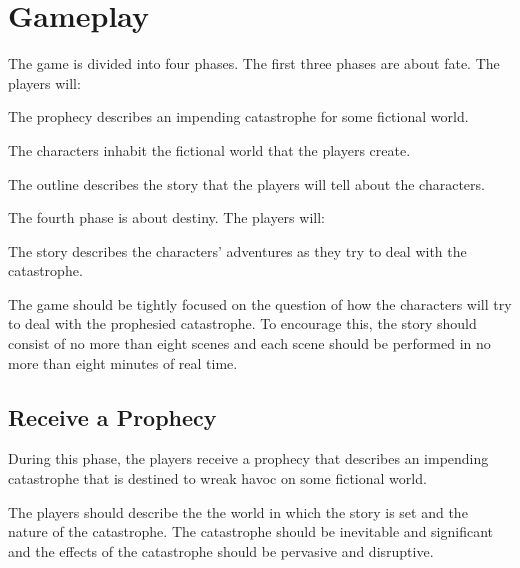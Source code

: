 \documentclass[12pt, a5paper, parskip=half-]{scrartcl}
\begin{document}
\newpage

\section*{Gameplay}
The game is divided into four phases.
The first three phases are about fate.
The players will:
\begin{description}[labelindent=0.25cm, leftmargin=\widthof{\hspace{0.25cm}\textbullet\space}, font=\normalfont\textbullet\bfseries\cinzel\small\space]
  \item[Receive a Prophecy] The prophecy describes an impending catastrophe for some fictional world.
  \item[Create Characters] The characters inhabit the fictional world that the players create.
  \item[Write an Outline] The outline describes the story that the players will tell about the characters.
\end{description}

The fourth phase is about destiny.
The players will:
\begin{description}[labelindent=0.25cm, leftmargin=\widthof{\hspace{0.25cm}\textbullet\space}, font=\normalfont\textbullet\bfseries\cinzel\small\space]
	\item[Tell the Story] The story describes the characters' adventures as they try to deal with the catastrophe.
\end{description}

\bigskip

The game should be tightly focused on the question of how the characters will try to deal with the prophesied catastrophe.
To encourage this, the story should consist of no more than eight scenes and each scene should be performed in no more than eight minutes of real time. 

\subsection*{Receive a Prophecy}
During this phase, the players receive a prophecy that describes an impending catastrophe that is destined to wreak havoc on some fictional world.

The players should describe the the world in which the story is set and the nature of the catastrophe.
The catastrophe should be inevitable and significant and the effects of the catastrophe should be pervasive and disruptive.
\end{document}
